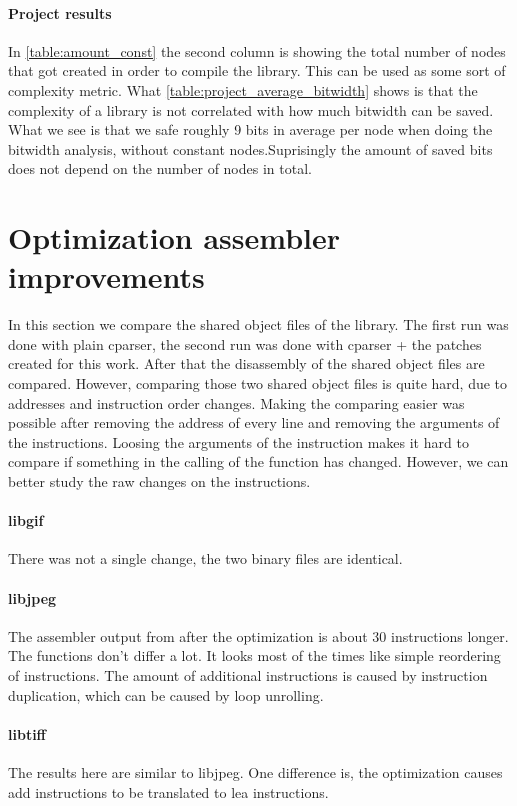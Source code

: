 \paragraph{Project results}

In \autoref{table:amount_const} the second column is showing the total number of nodes that got created in order to compile the library. This can be used as some sort of complexity metric. What \ref{table:project_average_bitwidth} shows is that the complexity of a library is not  correlated with how much bitwidth can be saved. What we see is that we safe roughly 9 bits in average per node when doing the bitwidth analysis, without constant nodes.Suprisingly the amount of saved bits does not depend on the number of nodes in total.

\section{Optimization assembler improvements}

In this section we compare the shared object files of the library. The first run was done with plain cparser, the second run was done with cparser + the patches created for this work.
After that the disassembly of the shared object files are compared. However, comparing those two shared object files is quite hard, due to addresses and instruction order changes. Making the comparing easier was possible after removing the address of every line and removing the arguments of the instructions. Loosing the arguments of the instruction makes it hard to compare if something in the calling of the function has changed. However, we can better study the raw changes on the instructions.

\paragraph{libgif} There was not a single change, the two binary files are identical.
\paragraph{libjpeg} The assembler output from after the optimization is about 30 instructions longer. The functions don't differ a lot. It looks most of the times like simple reordering of instructions. The amount of additional instructions is caused by instruction duplication, which can be caused by loop unrolling.

\paragraph{libtiff} The results here are similar to libjpeg. One difference is, the optimization causes add instructions to be translated to lea instructions. 

